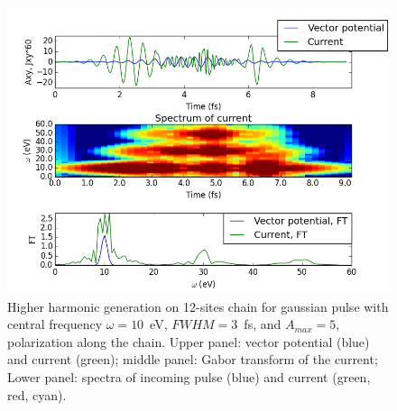 \documentclass[prb,aps,twocolumn,showpacs,amsmath,amssymb]{revtex4}%
\begin{document}
\begin{figure}[h!]
 \includegraphics[width=1.0\linewidth,angle=0]{HHGtestRui.png}
\caption{Higher harmonic generation on 12-sites chain for gaussian pulse with central frequency $\omega=10$~eV, $FWHM=3$~fs, and $A_{max}=5$, polarization along the chain. Upper panel: vector potential (blue) and current (green); middle panel: Gabor transform of the current; Lower panel: spectra of incoming pulse (blue) and current (green, red, cyan).}
\label{HHGtestRui}  
\end{figure}
\end{document}
